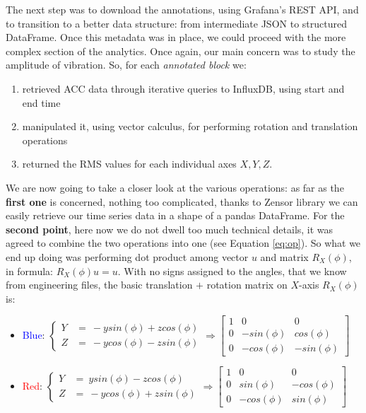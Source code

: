 The next step was to download the annotations, using Grafana's REST API, and to transition to a better data structure: from intermediate JSON to structured DataFrame.
Once this metadata was in place, we could proceed with the more complex section of the analytics.
Once again, our main concern was to study the amplitude of vibration. So, for each \emph{annotated block} we: 
\begin{enumerate}
    \item retrieved ACC data through iterative queries to InfluxDB, using start and end time
    \item manipulated it, using vector calculus, for performing rotation and translation operations
    \item returned the \ac{RMS} values for each individual axes $X,Y,Z$.
\end{enumerate}
We are now going to take a closer look at the various operations: %
as far as the \textbf{first one} is concerned, nothing too complicated, thanks to Zensor library we can easily retrieve our time series data in a shape of a pandas DataFrame.
For the \textbf{second point}, here now we do not dwell too much technical details, it was agreed to combine the two operations into one (see Equation \ref{eq:op}).
So what we end up doing was performing dot product among vector $u$ and matrix $R_X(\phi)$, in formula: $R_X(\phi)u = u$.
With no signs assigned to the angles, that we know from engineering files, the basic translation $+$ rotation matrix on $X$-axis $R_X(\phi)$ is:
\begin{itemize}
    \item \textcolor{blue}{Blue}: \( \left\{ 
        \begin{array}{cl} 
            Y & = \ -y sin(\phi) + z cos(\phi) \\
            Z & = \ -y cos(\phi) - z sin(\phi) 
        \end{array} \right. 
        \Rightarrow  
        \begin{bmatrix}
            1 & 0 & 0 \\
            0 & -sin(\phi) & cos(\phi)  \\
            0 & -cos(\phi) & -sin(\phi)  
        \end{bmatrix} \)
    \item \textcolor{red}{Red}: \( \left\{ 
        \begin{array}{cl}
            Y & = \ y sin(\phi) - z cos(\phi) \\
            Z & = \ -y cos(\phi) + z sin(\phi) 
        \end{array} \right. 
        \Rightarrow
        \begin{bmatrix}
            1 & 0 & 0 \\
            0 & sin(\phi) & -cos(\phi)  \\
            0 & -cos(\phi) & sin(\phi)  
        \end{bmatrix} \)
\end{itemize}
